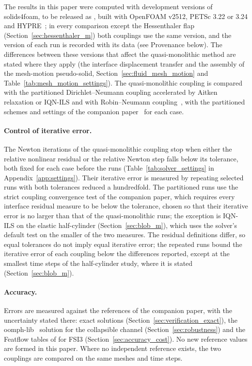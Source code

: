 The results in this paper were computed with development versions of solids4foam, to be released as , built with OpenFOAM v2512, PETSc 3.22 or 3.24 and HYPRE~\citep{hypre}; in every comparison except the Hessenthaler flap (Section~\ref{sec:hessenthaler_m}) both couplings use the same version, and the version of each run is recorded with its data (see Provenance below).
The differences between these versions that affect the quasi-monolithic method are stated where they apply (the interface displacement transfer and the assembly of the mesh-motion pseudo-solid, Section~\ref{sec:fluid_mesh_motion} and Table~\ref{tab:mesh_motion_settings}).
The quasi-monolithic coupling is compared with the partitioned Dirichlet--Neumann coupling accelerated by Aitken relaxation or IQN-ILS and with Robin--Neumann coupling~\citep{Tukovic2018b}, with the partitioned schemes and settings of the companion paper~\citep{CardiffFSIVerification2026} for each case.

\paragraph{Control of iterative error.}
The Newton iterations of the quasi-monolithic coupling stop when either the relative nonlinear residual or the relative Newton step falls below its tolerance, both fixed for each case before the runs (Table~\ref{tab:solver_settings} in Appendix~\ref{app:settings}).
Their iterative error is measured by repeating selected runs with both tolerances reduced a hundredfold.
The partitioned runs use the strict coupling convergence test of the companion paper, which requires every interface residual measure to be below the tolerance, chosen so that their iterative error is no larger than that of the quasi-monolithic runs; the exception is IQN-ILS on the elastic half-cylinder (Section~\ref{sec:blob_m}), which uses the solver's default test on the smaller of the two measures.
The residual definitions differ, so equal tolerances do not imply equal iterative error; the repeated runs bound the iterative error of each coupling below the differences reported, except at the smallest time steps of the half-cylinder study, where it is stated (Section~\ref{sec:blob_m}).

\paragraph{Accuracy.}
Errors are measured against the references of the companion paper, with the uncertainty stated there: exact solutions (Section~\ref{sec:verification_exact}), the oomph-lib~\citep{Heil2006} solution for the collapsible channel (Section~\ref{sec:robustness}) and the Featflow tables of \citet{Turek2006} for FSI3 (Section~\ref{sec:accuracy_cost}).
No new reference values are formed in this paper.
Where no independent reference exists, the two couplings are compared on the same meshes and time steps.

